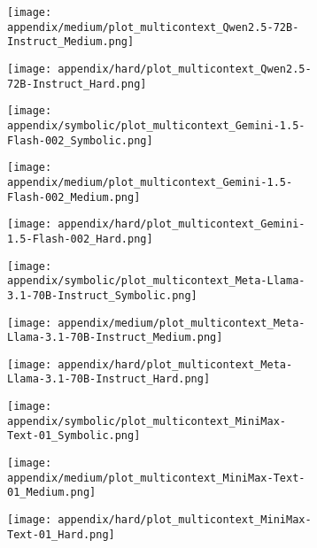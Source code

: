 \begin{figure}[h!]
\begin{subfigure}{0.17\textwidth}
    \texttt{[image: appendix/medium/plot\_multicontext\_Qwen2.5-72B-Instruct\_Medium.png]}
  \end{subfigure}
  \hfill
  \begin{subfigure}{0.17\textwidth}
    \texttt{[image: appendix/hard/plot\_multicontext\_Qwen2.5-72B-Instruct\_Hard.png]}
  \end{subfigure}
  \hfill
  \begin{subfigure}{0.17\textwidth}
    \texttt{[image: appendix/symbolic/plot\_multicontext\_Gemini-1.5-Flash-002\_Symbolic.png]}
  \end{subfigure}
  \hfill
  \begin{subfigure}{0.17\textwidth}
    \texttt{[image: appendix/medium/plot\_multicontext\_Gemini-1.5-Flash-002\_Medium.png]}
  \end{subfigure}
  \hfill
  \begin{subfigure}{0.17\textwidth}
    \texttt{[image: appendix/hard/plot\_multicontext\_Gemini-1.5-Flash-002\_Hard.png]}
  \end{subfigure}
  \hfill
  \begin{subfigure}{0.17\textwidth}
    \texttt{[image: appendix/symbolic/plot\_multicontext\_Meta-Llama-3.1-70B-Instruct\_Symbolic.png]}
  \end{subfigure}
  \hfill
  \begin{subfigure}{0.17\textwidth}
    \texttt{[image: appendix/medium/plot\_multicontext\_Meta-Llama-3.1-70B-Instruct\_Medium.png]}
  \end{subfigure}
  \hfill
  \begin{subfigure}{0.17\textwidth}
    \texttt{[image: appendix/hard/plot\_multicontext\_Meta-Llama-3.1-70B-Instruct\_Hard.png]}
  \end{subfigure}
  \hfill
  \begin{subfigure}{0.17\textwidth}
    \texttt{[image: appendix/symbolic/plot\_multicontext\_MiniMax-Text-01\_Symbolic.png]}
  \end{subfigure}
  \hfill
  \begin{subfigure}{0.17\textwidth}
    \texttt{[image: appendix/medium/plot\_multicontext\_MiniMax-Text-01\_Medium.png]}
  \end{subfigure}
  \hfill
  \begin{subfigure}{0.17\textwidth}
    \texttt{[image: appendix/hard/plot\_multicontext\_MiniMax-Text-01\_Hard.png]}
  \end{subfigure}

\end{figure}
